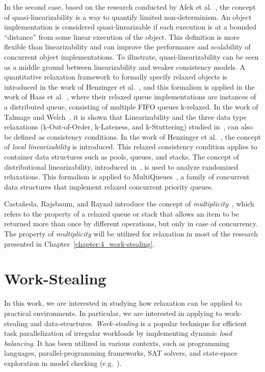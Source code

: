 In the second case, based on the research conducted by Afek et al.~\cite{DBLP_conf_opodis_AfekKY10}, the concept of quasi-linearizability is a way to quantify limited non-determinism. An object implementation is considered quasi-linearizable if each execution is at a bounded ``distance'' from some linear execution of the object. This definition is more flexible than linearizability and can improve the performance and scalability of concurrent object implementations. To illustrate, quasi-linearizability can be seen as a middle ground between linearizability and weaker consistency models. A quantitative relaxation framework to formally specify relaxed objects is introduced in the work of Henzinger et al.~\cite{DBLP_conf_popl_HenzingerKPSS13}, and this formalism is applied in the work of Haas et al.~\cite{DBLP_conf_cf_HaasLHPSKS13}, where their relaxed queue implementations are instances of a distributed queue, consisting of multiple FIFO queues k-relaxed. In the work of Talmage and Welch~\cite{DBLP_journals_algorithms_TalmageW18}, it is shown that Linearizability and the three data type relaxations (k-Out-of-Order, k-Lateness, and k-Stuttering) studied in~\cite{DBLP_conf_popl_HenzingerKPSS13},  can also be defined as consistency conditions. In the work of Henzinger et al.~\cite{DBLP_conf_concur_HaasHHKLPSSV16}, the concept of \textit{local linearizability} is introduced. This relaxed consistency condition applies to container data structures such as pools, queues, and stacks. The concept of distributional linearizability, introduced in~\cite{DBLP_conf_spaa_Alistarh0KLN18}, is used to analyze randomized relaxations. This formalism is applied to MultiQueues~\cite{DBLP_conf_spaa_RihaniSD15}, a family of concurrent data structures that implement relaxed concurrent priority queues.

Castañeda, Rajsbaum, and Raynal introduce the concept of \emph{multiplicity}~\cite{DBLP_journals_dc_CastanedaRR23, DBLP_conf_opodis_CastanedaRR20}, which refers to the property of a relaxed queue or stack that allows an item to be returned more than once by different operations, but only in case of concurrency. The property of \emph{multiplicity} will be utilized for relaxation in most of the research presented in Chapter~\ref{chapter:4_work-stealing}.

\section{\label{section:work-stealing}Work-Stealing}

In this work, we are interested in studying how relaxation can be applied to practical environments. In particular, we are interested in applying to work-stealing and data-structures. \emph{Work-stealing} is a popular technique for efficient task parallelization of irregular workloads by implementing dynamic \emph{load balancing}. It has been utilized in various contexts, such as programming languages, parallel-programming frameworks, SAT solvers, and state-space exploration in model checking (e.g.~\cite{DBLP_journals_tpds_AyguadeCDHLMTUZ09,
  DBLP_journals_jpdc_BlumofeJKLRZ96, DBLP_journals_tpds_AyguadeCDHLMTUZ09, DBLP_conf_jvm_FloodDSZ01, DBLP_conf_pldi_FrigoLR98, DBLP_conf_java_Lea00, DBLP_conf_hpca_RangerRPBK07}).

